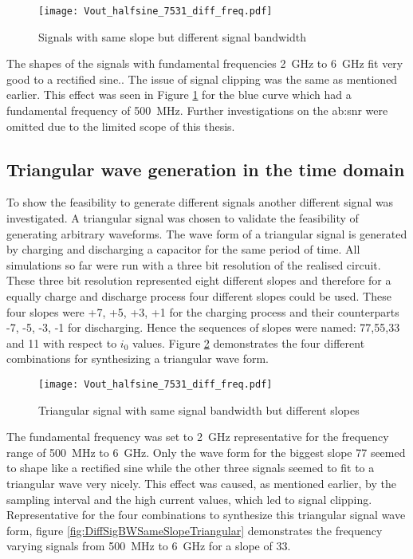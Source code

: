 \begin{figure}[htb!]
	\centering
  \texttt{[image: Vout\_halfsine\_7531\_diff\_freq.pdf]}
	\caption{Signals with same slope but different signal bandwidth}
	\label{fig:DiffSigBWSameSlope}
\end{figure}

The shapes of the signals with fundamental frequencies \SI{2}{\giga \hertz} to \SI{6}{\giga \hertz} fit very good to a rectified sine..
The issue of signal clipping was the same as mentioned earlier.
This effect was seen in Figure \ref{fig:DiffSigBWSameSlope} for the blue curve which had a fundamental frequency of \SI{500}{\mega \hertz}.
Further investigations on the \gls{ab:snr} were omitted due to the limited scope of this thesis.

\subsection{Triangular wave generation in the time domain}
To show the feasibility to generate different signals another different signal was investigated.
A triangular signal was chosen to validate the feasibility of generating arbitrary waveforms.
The wave form of a triangular signal is generated by charging and discharging a capacitor for the same period of time.
All simulations so far were run with a three bit resolution of the realised circuit.
These three bit resolution represented eight different slopes and therefore for a equally charge and discharge process four different slopes could be used.
These four slopes were +7, +5, +3, +1 for the charging process and their counterparts -7, -5, -3, -1 for discharging.
Hence the sequences of slopes were named: 77,55,33 and 11 with respect to $i_0$ values.
Figure \ref{fig:DiffSlopeSameBWTriangular} demonstrates the four different combinations for synthesizing a triangular wave form.

\begin{figure}[htb!]
	\centering
  \texttt{[image: Vout\_halfsine\_7531\_diff\_freq.pdf]}
	\caption{Triangular signal with same signal bandwidth but different slopes}
	\label{fig:DiffSlopeSameBWTriangular}
\end{figure}

The fundamental frequency was set to \SI{2}{\giga \hertz} representative for the frequency range of \SI{500}{\mega \hertz} to \SI{6}{\giga \hertz}.
Only the wave form for the biggest slope 77 seemed to shape like a rectified sine while the other three signals seemed to fit to a triangular wave very nicely.
This effect was caused, as mentioned earlier, by the sampling interval and the high current values, which led to signal clipping.
Representative for the four combinations to synthesize this triangular signal wave form, 
figure \ref{fig:DiffSigBWSameSlopeTriangular} demonstrates the frequency varying signals from \SI{500}{\mega \hertz} to \SI{6}{\giga \hertz} for a slope of 33.


